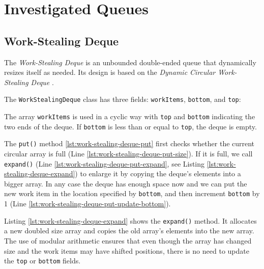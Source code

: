 
\chapter{Investigated Queues}
\label{chap:queues-implementation}

\section{Work-Stealing Deque}
\label{sec:queues-implementation-ws-deque}

The \emph{Work-Stealing Deque} is an unbounded double-ended queue that
dynamically resizes itself as needed. Its design is based on the
\emph{Dynamic Circular Work-Stealing Deque} \cite{Chase2005, Lev2005}.

The \lstinline!WorkStealingDeque! class has three fields:
\lstinline!workItems!, \lstinline!bottom!, and \lstinline!top!:



The array \lstinline!workItems! is used in a cyclic way with
\lstinline!top! and \lstinline!bottom! indicating the two ends of the
deque. If \lstinline!bottom! is less than or equal to \lstinline!top!,
the deque is empty.

The \lstinline!put()! method \ref{lst:work-stealing-deque-put} first
checks whether the current circular array is full (Line
\ref{lst:work-stealing-deque-put-size}). If it is full, we call
\lstinline!expand()! (Line \ref{lst:work-stealing-deque-put-expand},
see Listing \ref{lst:work-stealing-deque-expand}) to enlarge it by
copying the deque's elements into a bigger array. In any case the
deque has enough space now and we can put the new work item in the
location specified by \lstinline!bottom!, and then increment
\lstinline!bottom! by 1 (Line
\ref{lst:work-stealing-deque-put-update-bottom}).



Listing \ref{lst:work-stealing-deque-expand} shows the
\lstinline!expand()! method. It allocates a new doubled size array and
copies the old array's elements into the new array. The use of modular
arithmetic ensures that even though the array has changed size and the
work items may have shifted positions, there is no need to update the
\lstinline!top! or \lstinline!bottom! fields.

